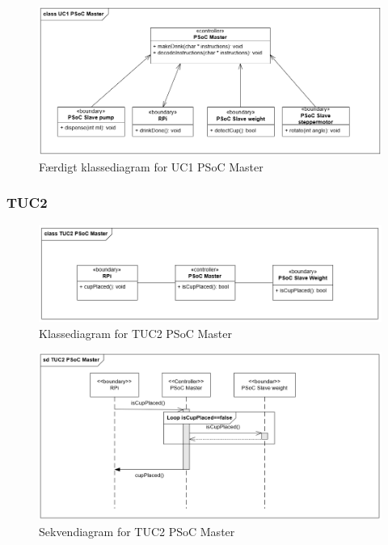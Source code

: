 \begin{figure}[H]
	\centering
	\includegraphics[width=1\textwidth]{Images/Applikationsmodeller/PSoCMaster/UC1_cd_PSoC_Master_final.png}
	\caption{Færdigt klassediagram for UC1 PSoC Master}
	\label{fig:cdUC1PSoCMaster_final}
\end{figure}

\subsubsection{TUC2}

\begin{figure}[H]
	\centering
	\includegraphics[width=1\textwidth]{Images/Applikationsmodeller/PSoCMaster/TUC2_cd_PSoC_Master.png}
	\caption{Klassediagram for TUC2 PSoC Master}
	\label{fig:cdTUC2PSoCMaster}
\end{figure}

\begin{figure}[H]
	\centering
	\includegraphics[width=1\textwidth]{Images/Applikationsmodeller/PSoCMaster/TUC2_sd_PSoC_Master.png}
	\caption{Sekvendiagram for TUC2 PSoC Master}
	\label{fig:sdTUC2PSoCMaster}
\end{figure}

